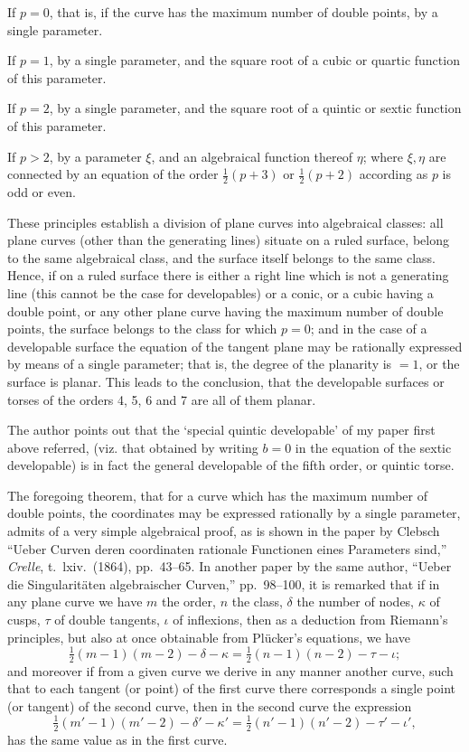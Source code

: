 \documentclass[11pt]{article}
\begin{document}
If $p = 0$, that is, if the curve has the maximum number of double points, by a single parameter.

If $p = 1$, by a single parameter, and the square root of a cubic or quartic function of this parameter.

If $p = 2$, by a single parameter, and the square root of a quintic or sextic function of this parameter.

If $p > 2$, by a parameter $\xi$, and an algebraical function thereof $\eta$; where $\xi, \eta$ are connected by an equation of the order $\tfrac{1}{2}(p+3)$ or $\tfrac{1}{2}(p+2)$ according as $p$ is odd or even.

These principles establish a division of plane curves into algebraical classes: all plane curves (other than the generating lines) situate on a ruled surface, belong to the same algebraical class, and the surface itself belongs to the same class. Hence, if on a ruled surface there is either a right line which is not a generating line (this cannot be the case for developables) or a conic, or a cubic having a double point, or any other plane curve having the maximum number of double points, the surface belongs to the class for which $p = 0$; and in the case of a developable surface the equation of the tangent plane may be rationally expressed by means of a single parameter; that is, the degree of the planarity is $= 1$, or the surface is planar. This leads to the conclusion, that the developable surfaces or torses of the orders 4, 5, 6 and 7 are all of them planar.

The author points out that the `special quintic developable' of my paper first above referred, (viz. that obtained by writing $b = 0$ in the equation of the sextic developable) is in fact the general developable of the fifth order, or quintic torse.

The foregoing theorem, that for a curve which has the maximum number of double points, the coordinates may be expressed rationally by a single parameter, admits of a very simple algebraical proof, as is shown in the paper by Clebsch ``Ueber Curven deren coordinaten rationale Functionen eines Parameters sind,'' \emph{Crelle}, t.~lxiv.~(1864), pp.~43--65. In another paper by the same author, ``Ueber die Singularit\"aten algebraischer Curven,'' pp.~98--100, it is remarked that if in any plane curve we have $m$ the order, $n$ the class, $\delta$ the number of nodes, $\kappa$ of cusps, $\tau$ of double tangents, $\iota$ of inflexions, then as a deduction from Riemann's principles, but also at once obtainable from Pl\"ucker's equations, we have
\[ \tfrac{1}{2}(m-1)(m-2) - \delta - \kappa = \tfrac{1}{2}(n-1)(n-2) - \tau - \iota; \]
and moreover if from a given curve we derive in any manner another curve, such that to each tangent (or point) of the first curve there corresponds a single point (or tangent) of the second curve, then in the second curve the expression
\[ \tfrac{1}{2}(m'-1)(m'-2) - \delta' - \kappa' = \tfrac{1}{2}(n'-1)(n'-2) - \tau' - \iota', \]
has the same value as in the first curve.
\end{document}
